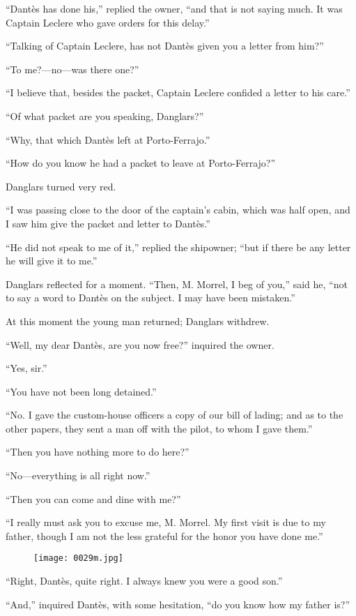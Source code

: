 “Dantès has done his,” replied the owner, “and that is not saying much.
It was Captain Leclere who gave orders for this delay.”

“Talking of Captain Leclere, has not Dantès given you a letter from
him?”

“To me?—no—was there one?”

“I believe that, besides the packet, Captain Leclere confided a letter
to his care.”

“Of what packet are you speaking, Danglars?”

“Why, that which Dantès left at Porto-Ferrajo.”

“How do you know he had a packet to leave at Porto-Ferrajo?”

Danglars turned very red.

“I was passing close to the door of the captain’s cabin, which was half
open, and I saw him give the packet and letter to Dantès.”

“He did not speak to me of it,” replied the shipowner; “but if there be
any letter he will give it to me.”

Danglars reflected for a moment. “Then, M. Morrel, I beg of you,” said
he, “not to say a word to Dantès on the subject. I may have been
mistaken.”

At this moment the young man returned; Danglars withdrew.

“Well, my dear Dantès, are you now free?” inquired the owner.

“Yes, sir.”

“You have not been long detained.”

“No. I gave the custom-house officers a copy of our bill of lading; and
as to the other papers, they sent a man off with the pilot, to whom I
gave them.”

“Then you have nothing more to do here?”

“No—everything is all right now.”

“Then you can come and dine with me?”

“I really must ask you to excuse me, M. Morrel. My first visit is due
to my father, though I am not the less grateful for the honor you have
done me.”

\begin{figure}[ht]
\texttt{[image: 0029m.jpg]}
\end{figure}

“Right, Dantès, quite right. I always knew you were a good son.”

“And,” inquired Dantès, with some hesitation, “do you know how my
father is?”


